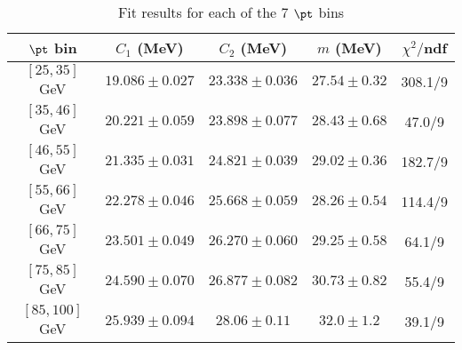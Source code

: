 \begin{table}[h!]
\centering
\begin{tabular}{c||c|c|c||c}
$\pt$ bin & $C_1$ (MeV) & $C_2$ (MeV) & $m$ (MeV) & $\chi^2/$ndf \\
\hline
$[25, 35]$ GeV & $19.086\pm0.027$ & $23.338\pm0.036$ & $27.54\pm0.32$ & 308.1/9\\
$[35, 46]$ GeV & $20.221\pm0.059$ & $23.898\pm0.077$ & $28.43\pm0.68$ & 47.0/9\\
$[46, 55]$ GeV & $21.335\pm0.031$ & $24.821\pm0.039$ & $29.02\pm0.36$ & 182.7/9\\
$[55, 66]$ GeV & $22.278\pm0.046$ & $25.668\pm0.059$ & $28.26\pm0.54$ & 114.4/9\\
$[66, 75]$ GeV & $23.501\pm0.049$ & $26.270\pm0.060$ & $29.25\pm0.58$ & 64.1/9\\
$[75, 85]$ GeV & $24.590\pm0.070$ & $26.877\pm0.082$ & $30.73\pm0.82$ & 55.4/9\\
$[85, 100]$ GeV & $25.939\pm0.094$ & $28.06\pm0.11$ & $32.0\pm1.2$ & 39.1/9\\
\end{tabular}
\caption{Fit results for each of the 7 $\pt$ bins}
\label{t:fit}
\end{table}
